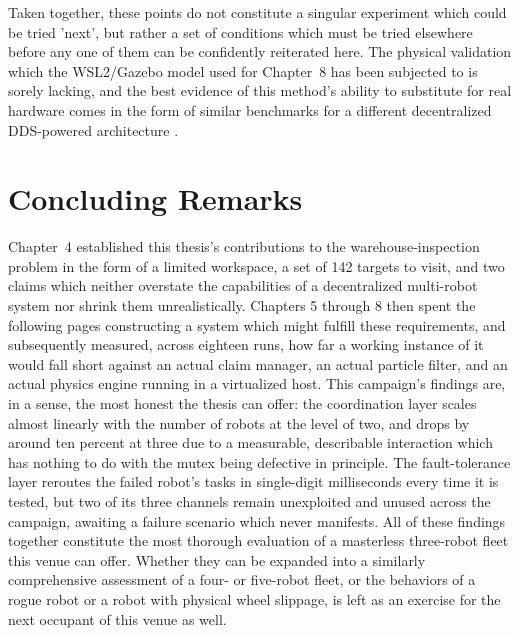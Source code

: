 Taken together, these points do not constitute a singular experiment which could be tried 'next', but rather a set of conditions which must be tried elsewhere before any one of them can be confidently reiterated here. The physical validation which the WSL2/Gazebo model used for Chapter~8 has been subjected to is sorely lacking, and the best evidence of this method's ability to substitute for real hardware comes in the form of similar benchmarks for a different decentralized DDS-powered architecture \cite{gaadhe2026collective}.

\section{Concluding Remarks\label{sec:ch9_closing}}

Chapter~4 established this thesis's contributions to the warehouse-inspection problem in the form of a limited workspace, a set of 142 targets to visit, and two claims which neither overstate the capabilities of a decentralized multi-robot system nor shrink them unrealistically. Chapters 5 through 8 then spent the following pages constructing a system which might fulfill these requirements, and subsequently measured, across eighteen runs, how far a working instance of it would fall short against an actual claim manager, an actual particle filter, and an actual physics engine running in a virtualized host. This campaign's findings are, in a sense, the most honest the thesis can offer: the coordination layer scales almost linearly with the number of robots at the level of two, and drops by around ten percent at three due to a measurable, describable interaction which has nothing to do with the mutex being defective in principle. The fault-tolerance layer reroutes the failed robot's tasks in single-digit milliseconds every time it is tested, but two of its three channels remain unexploited and unused across the campaign, awaiting a failure scenario which never manifests. All of these findings together constitute the most thorough evaluation of a masterless three-robot fleet this venue can offer. Whether they can be expanded into a similarly comprehensive assessment of a four- or five-robot fleet, or the behaviors of a rogue robot or a robot with physical wheel slippage, is left as an exercise for the next occupant of this venue as well.